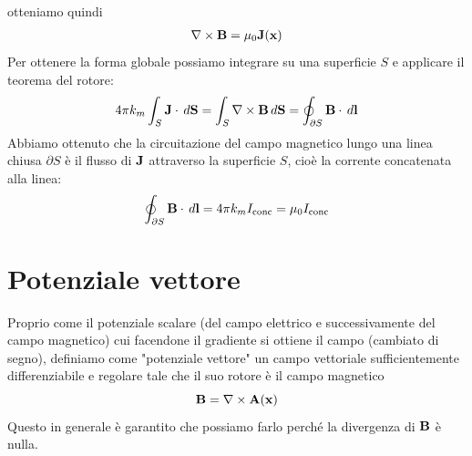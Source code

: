 otteniamo quindi
\begin{align}
  \mathbf{\nabla}\times\mathbf{ B } = \mu_0 \mathbf{ J(x) }
\end{align}
Per ottenere la forma globale possiamo integrare su una superficie $ S $ e applicare il teorema del rotore:
\begin{align}
  4\pi k_m \int_S \mathbf{ J } \cdot \,d\mathbf{ S } = \int_S \mathbf{\nabla}\times\mathbf{ B } \,d\mathbf{ S } = \oint_{\partial S} \mathbf{ B } \cdot \, d\mathbf{ l }
\end{align}
Abbiamo ottenuto che la circuitazione del campo magnetico lungo una linea chiusa $ \partial S $ è il flusso di $ \mathbf{ J } $ attraverso la 
superficie $ S $, cioè la corrente concatenata alla linea:
\begin{equation} \label{eq:circuitazione_B=i_concatenata}
  \oint_{\partial S} \mathbf{ B } \cdot \, d\mathbf{ l } = 4\pi k_m I_{\text{conc}} = \mu_0 I_{\text{conc}}
\end{equation}



\section{Potenziale vettore}
Proprio come il potenziale scalare (del campo elettrico e successivamente del campo magnetico) cui facendone il gradiente si ottiene il campo 
(cambiato di segno), definiamo come "potenziale vettore" un campo vettoriale sufficientemente differenziabile e regolare tale che il suo 
rotore è il campo magnetico
\begin{equation}
  \mathbf{ B } = \mathbf{\nabla}\times\mathbf{ A(x) }
\end{equation}
Questo in generale è garantito che possiamo farlo perché la divergenza di $ \mathbf{ B } $ è nulla.


